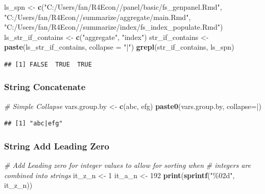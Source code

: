 \documentclass[
]{book}
\newenvironment{Shaded}{\begin{snugshade}}{\end{snugshade}}
\newcommand{\CommentTok}[1]{\textcolor[rgb]{0.56,0.35,0.01}{\textit{#1}}}
\newcommand{\DataTypeTok}[1]{\textcolor[rgb]{0.13,0.29,0.53}{#1}}
\newcommand{\DecValTok}[1]{\textcolor[rgb]{0.00,0.00,0.81}{#1}}
\newcommand{\KeywordTok}[1]{\textcolor[rgb]{0.13,0.29,0.53}{\textbf{#1}}}
\newcommand{\NormalTok}[1]{#1}
\newcommand{\StringTok}[1]{\textcolor[rgb]{0.31,0.60,0.02}{#1}}
\begin{document}
\begin{Shaded}
\begin{Highlighting}[]
\NormalTok{ls\_spn \textless{}{-}}\StringTok{ }\KeywordTok{c}\NormalTok{(}\StringTok{"C:/Users/fan/R4Econ//panel/basic/fs\_genpanel.Rmd"}\NormalTok{,}
            \StringTok{"C:/Users/fan/R4Econ//summarize/aggregate/main.Rmd"}\NormalTok{,}
            \StringTok{"C:/Users/fan/R4Econ//summarize/index/fs\_index\_populate.Rmd"}\NormalTok{)}
\NormalTok{ls\_str\_if\_contains \textless{}{-}}\StringTok{ }\KeywordTok{c}\NormalTok{(}\StringTok{"aggregate"}\NormalTok{, }\StringTok{"index"}\NormalTok{)}
\NormalTok{str\_if\_contains \textless{}{-}}\StringTok{ }\KeywordTok{paste}\NormalTok{(ls\_str\_if\_contains, }\DataTypeTok{collapse =} \StringTok{"|"}\NormalTok{)}
\KeywordTok{grepl}\NormalTok{(str\_if\_contains, ls\_spn)}
\end{Highlighting}
\end{Shaded}

\begin{verbatim}
## [1] FALSE  TRUE  TRUE
\end{verbatim}

\hypertarget{string-concatenate}{%
\subsubsection{String Concatenate}\label{string-concatenate}}

\begin{Shaded}
\begin{Highlighting}[]
\CommentTok{\# Simple Collapse}
\NormalTok{vars.group.by \textless{}{-}}\StringTok{ }\KeywordTok{c}\NormalTok{(}\StringTok{\textquotesingle{}abc\textquotesingle{}}\NormalTok{, }\StringTok{\textquotesingle{}efg\textquotesingle{}}\NormalTok{)}
\KeywordTok{paste0}\NormalTok{(vars.group.by, }\DataTypeTok{collapse=}\StringTok{\textquotesingle{}|\textquotesingle{}}\NormalTok{)}
\end{Highlighting}
\end{Shaded}

\begin{verbatim}
## [1] "abc|efg"
\end{verbatim}

\hypertarget{string-add-leading-zero}{%
\subsubsection{String Add Leading Zero}\label{string-add-leading-zero}}

\begin{Shaded}
\begin{Highlighting}[]
\CommentTok{\# Add Leading zero for integer values to allow for sorting when}
\CommentTok{\# integers are combined into strings}
\NormalTok{it\_z\_n \textless{}{-}}\StringTok{ }\DecValTok{1}
\NormalTok{it\_a\_n \textless{}{-}}\StringTok{ }\DecValTok{192}
\KeywordTok{print}\NormalTok{(}\KeywordTok{sprintf}\NormalTok{(}\StringTok{"\%02d"}\NormalTok{, it\_z\_n))}
\end{Highlighting}
\end{Shaded}
\end{document}
